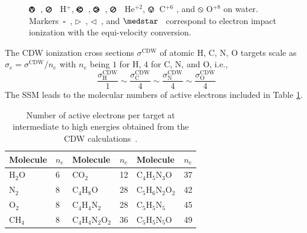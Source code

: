 \documentclass[10pt,showpacs,showkeys,twocolumn]{revtex4-1}
\begin{document}
\begin{figure}[!htb]
{{\fontsize{11}{20}\color{red}$\pmb{\varowedge}$}~\cite{pRudd85}, 
{\fontsize{11}{20}\color{red}$\pmb{\varoslash}$}~\cite{toburen80} H$^+$,
{\fontsize{11}{20}\color{ForestGreen}$\pmb{\varolessthan}$}~\cite{Ohsawa05},
{\fontsize{11}{20}\color{ForestGreen}$\pmb{\varogreaterthan}$}~\cite{Rudd85},
{\fontsize{11}{20}\color{ForestGreen}$\pmb{\varoslash}$}~\cite{toburen80} He$^{+2}$,
{\fontsize{11}{20}\color{Purple}$\pmb{\ovee}$}~C$^{+6}$ \cite{DalCappello2009,Bhattacharjee17}, and 
{\fontsize{11}{20}\color{BurntOrange}$\pmb{\obslash}$}
O$^{+8}$ \cite{Tribedi_O_water} on water.
Markers~$\square$~\cite{rahman2016}, 
$\rhd$~\cite{bug2017}, 
$\lhd$~\cite{wolf2019}, and 
$\medstar$~\cite{fuss2009} correspond to electron impact ionization with 
the equi-velocity conversion.}
\label{fig:zreduced}
\end{figure} 

The CDW ionization cross sections $\sigma^{\mathrm{CDW}}$ of atomic H, 
C, N, O targets scale as $\sigma_e=\sigma^{\mathrm{CDW}}/n_e$ with $n_e$ 
being $1$ for H, $4$ for C, N, and O, i.e.,
\begin{equation}
 \frac{\sigma_{\mathrm{H}}^{\mathrm{CDW}}}{1}\sim
 \frac{\sigma_{\mathrm{C}}^{\mathrm{CDW}}}{4}\sim
 \frac{\sigma_{\mathrm{N}}^{\mathrm{CDW}}}{4}\sim
 \frac{\sigma_{\mathrm{O}}^{\mathrm{CDW}}}{4}
\end{equation}
The SSM leads to the molecular numbers of active electrons included in 
Table \ref{nn}.

\contourlength{0.03em}

\begin{table}[t]
\begin{center}
\begin{tabular}{|ll|ll|ll|}
\hline
 Molecule & $n_e$ & Molecule          & $n_e$ & Molecule          & $n_e$ \\
\hline
 H$_2$O   & 6  & CO$_2$               & 12 & C$_4$H$_5$N$_3$O     & 37   \\ 
 N$_2$    & 8  & C$_4$H$_8$O          & 28 & C$_5$H$_6$N$_2$O$_2$ & 42   \\ 
 O$_2$    & 8  & C$_4$H$_4$N$_2$      & 28 & C$_5$H$_5$N$_5$      & 45   \\ 
 CH$_4$   & 8  & C$_4$H$_4$N$_2$O$_2$ & 36 & C$_5$H$_5$N$_5$O     & 49   \\ 
 \hline
\end{tabular}
\caption{Number of active electrons per target at intermediate to high 
energies obtained from the CDW calculations~\cite{MendezJPB20}.}
\label{nn}
\end{center}
\end{table}
\end{document}
